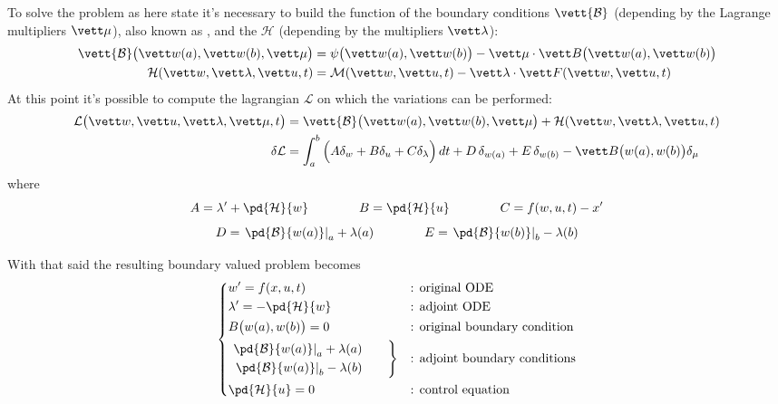 	To solve the problem as here state it's necessary to build the function of the boundary conditions $\vett{\mathcal B}$ (depending by the Lagrange multipliers $\vett \mu$), also known as , and the  $\mathcal H$ (depending by the multipliers $\vett \lambda$):
	\begin{equation}
		\begin{split}
			\vett{\mathcal B}\big(\vett w(a),\vett w(b),\vett \mu\big) & = \psi\big(\vett w(a),\vett w(b)\big) - \vett \mu\cdot \vett B\big( \vett w(a),\vett w(b) \big) \\
			\mathcal H(\vett w,\vett \lambda,\vett u,t) & = \mathcal M(\vett w, \vett u,t) - \vett \lambda \cdot \vett F(\vett w,\vett u, t)
		\end{split}
	\end{equation}
	At this point it's possible to compute the lagrangian $\mathcal L $ on which the variations can be performed:
	\begin{equation}
		\begin{split}
			\mathcal L \big( \vett w,\vett u,\vett \lambda, \vett \mu ,t \big) & = \vett{\mathcal B}\big(\vett w(a),\vett w(b),\vett \mu\big) + \mathcal H(\vett w,\vett \lambda,\vett u,t) \\
			\delta \mathcal L  & = \int_a^b \Big( A \delta_w + B \delta_u + C \delta_\lambda \Big)\, dt + D \, \delta_{w(a)} + E \, \delta_{w(b)} - \vett B \big(w(a),w(b)\big) \delta_\mu
		\end{split}
	\end{equation}
	where
	\[ A = \lambda' + \pd{\mathcal H}{w} \qquad \qquad B = \pd{\mathcal H}{u} \qquad \qquad C = f(w,u,t) - x' \] \[  D = \left.\pd{\mathcal B}{w(a)}\right|_{a}+ \lambda(a) \qquad \qquad E = \left.\pd{\mathcal B}{w(b)}\right|_{b} -\lambda(b) \]
	
	With that said the resulting boundary valued problem becomes
	\begin{equation} \label{eq:opt:generalsolution}
		\left\{ \begin{aligned}
			&w' = f(x,u,t) && \textrm{: original ODE} \\
			&\lambda' = - \pd{\mathcal H}{w} && \textrm{: adjoint ODE} \\
			&B\big(w(a),w(b)\big) = 0 && \textrm{: original boundary condition} \\
			&\left. \begin{aligned}
				 \left.\pd{\mathcal B}{w(a)}\right|_{a}+ \lambda(a) \\
				  \left.\pd{\mathcal B}{w(a)}\right|_{b} - \lambda(b)
			\end{aligned} \qquad \right\} &&\textrm{: adjoint boundary conditions} \\
			& \pd{\mathcal H}{u} = 0 && \textrm{: control equation}
		\end{aligned} \right. 
	\end{equation}
	
